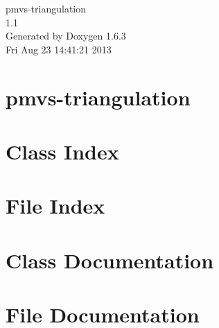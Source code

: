 \documentclass[a4paper]{book}
\begin{document}
\hypersetup{pageanchor=false}
\begin{titlepage}
\vspace*{7cm}
\begin{center}
{\Large pmvs-\/triangulation \\[1ex]\large 1.1 }\\
\vspace*{1cm}
{\large Generated by Doxygen 1.6.3}\\
\vspace*{0.5cm}
{\small Fri Aug 23 14:41:21 2013}\\
\end{center}
\end{titlepage}
\clearemptydoublepage
{}
\tableofcontents
\clearemptydoublepage
{}
\hypersetup{pageanchor=true}
\chapter{pmvs-\/triangulation}
\label{index}\hypertarget{index}{}
\chapter{Class Index}

\chapter{File Index}

\chapter{Class Documentation}




\chapter{File Documentation}









\printindex
\end{document}
